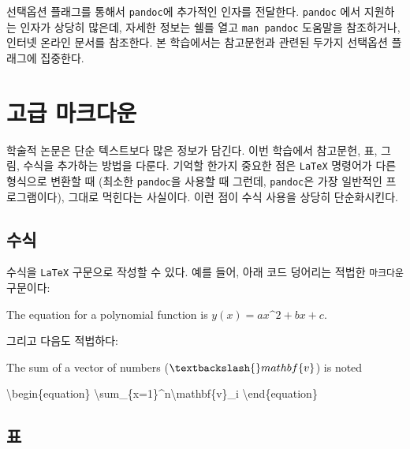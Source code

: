 \documentclass[
  letterpaper,
]{book}
\newenvironment{Shaded}{\begin{snugshade}}{\end{snugshade}}
\newcommand{\AttributeTok}[1]{\textcolor[rgb]{0.40,0.45,0.13}{#1}}
\begin{document}
선택옵션 플래그를 통해서 \texttt{pandoc}에 추가적인 인자를 전달한다.
\texttt{pandoc} 에서 지원하는 인자가 상당히 많은데, 자세한 정보는 쉘를
열고 \texttt{man\ pandoc} 도움말을 참조하거나, 인터넷 온라인 문서를
참조한다. 본 학습에서는 참고문헌과 관련된 두가지 선택옵션 플래그에
집중한다.

\hypertarget{uxace0uxae09-uxb9c8uxd06cuxb2e4uxc6b4}{%
\section{고급 마크다운}\label{uxace0uxae09-uxb9c8uxd06cuxb2e4uxc6b4}}

학술적 논문은 단순 텍스트보다 많은 정보가 담긴다. 이번 학습에서
참고문헌, 표, 그림, 수식을 추가하는 방법을 다룬다. 기억할 한가지 중요한
점은 \texttt{LaTeX} 명령어가 다른 형식으로 변환할 때 (최소한
\texttt{pandoc}을 사용할 때 그런데, \texttt{pandoc}은 가장 일반적인
프로그램이다), 그대로 먹힌다는 사실이다. 이런 점이 수식 사용을 상당히
단순화시킨다.

\hypertarget{uxc218uxc2dd-1}{%
\subsection{수식}\label{uxc218uxc2dd-1}}

수식을 \texttt{LaTeX} 구문으로 작성할 수 있다. 예를 들어, 아래 코드
덩어리는 적법한 \texttt{마크다운} 구문이다:

\begin{Shaded}
\begin{Highlighting}[]
\AttributeTok{The equation for a polynomial function is $y(x) = ax\^{}2 + bx +c$.}
\end{Highlighting}
\end{Shaded}

그리고 다음도 적법하다:

\begin{Shaded}
\begin{Highlighting}[]
\AttributeTok{The sum of a vector of numbers ($\textbackslash{}mathbf\{v\}$) is noted}

\AttributeTok{\textbackslash{}begin\{equation\}}
\AttributeTok{\textbackslash{}sum\_\{x=1\}\^{}n\textbackslash{}mathbf\{v\}\_i}
\AttributeTok{\textbackslash{}end\{equation\}}
\end{Highlighting}
\end{Shaded}

\hypertarget{uxd45c-2}{%
\subsection{표}\label{uxd45c-2}}
\end{document}
